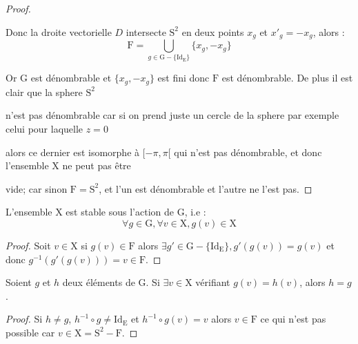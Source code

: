 \begin{proof}
\begin{center}
  \end{center}
    \par
  Donc la droite vectorielle $D$ intersecte $\mathrm{S}^2$ en deux points $x_g$ et $x'_g=-x_g$, alors :
  $$\mathrm{F}=\underset{g \in \mathrm{G}-\{\mathrm{Id_E}\}}{\bigcup}\{x_g, -x_g\} $$
  \par Or $\mathrm{G}$ est dénombrable et $\{x_g, -x_g\}$ est fini donc $\mathrm{F}$ est dénombrable. De plus il est clair que la sphere $\mathrm{S}^2$\par n'est pas dénombrable car si on prend juste un cercle de la sphere par exemple celui pour laquelle $z=0$ \par alors ce dernier est isomorphe à $[-\pi, \pi[$ qui n'est pas dénombrable, et donc l'ensemble $\mathrm{X}$ ne peut pas être \par vide; car sinon $\mathrm{F}=\mathrm{S}^2$, et l'un est dénombrable et l'autre ne l'est pas.\par
\end{proof}
\begin{lemma}\label{lemme11}
  L'ensemble $\mathrm{X}$ est stable sous l'action de $\mathrm{G}$, i.e :
  $$\forall g \in \mathrm{G},\forall v \in \mathrm{X}, g(v) \in \mathrm{X}$$
\end{lemma}
\begin{proof}
  \hfill

Soit $v \in \mathrm{X}$ si $g\left(v\right) \in \mathrm{F}$ alors $\exists g' \in \mathrm{G}-\{\mathrm{Id_E}\}, g'\left(g\left(v\right)\right)=g\left(v\right)$ et donc $g^{-1}\left(g'\left(g\left(v\right)\right)\right)=v \in \mathrm{F}$.
\end{proof}
\begin{lemma}\label{lemme12}
  Soient $g$ et $h$ deux éléments de $\mathrm{G}$. Si $\exists v \in \mathrm{X}$ vérifiant $g(v)=h(v)$, alors $h=g$.
\end{lemma}
\begin{proof}
  \hfill

  Si $h \neq g$, $h^{-1}\circ g \neq \mathrm{Id_E}$ et $h^{-1}\circ g(v)=v$ alors $v \in \mathrm{F}$ ce qui n'est pas possible car $v \in \mathrm{X}= \mathrm{S}^2-\mathrm{F}$.
\end{proof}
